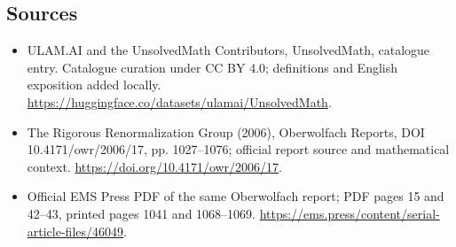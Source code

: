 \documentclass[11pt]{article}
\begin{document}
\subsection{Sources}
\begin{itemize}
\item[\hypertarget{source:statement:1}{S1}] ULAM.AI and the UnsolvedMath Contributors, UnsolvedMath, catalogue entry. Catalogue curation under CC BY 4.0; definitions and English exposition added locally.
\url{https://huggingface.co/datasets/ulamai/UnsolvedMath}.
\item[\hypertarget{source:statement:2}{S2}] The Rigorous Renormalization Group (2006), Oberwolfach Reports, DOI 10.4171/owr/2006/17, pp. 1027--1076; official report source and mathematical context.
\url{https://doi.org/10.4171/owr/2006/17}.
\item[\hypertarget{source:statement:3}{S3}] Official EMS Press PDF of the same Oberwolfach report; PDF pages 15 and 42--43, printed pages 1041 and 1068--1069.
\url{https://ems.press/content/serial-article-files/46049}.
\end{itemize}
\label{end:statement}
\end{document}
